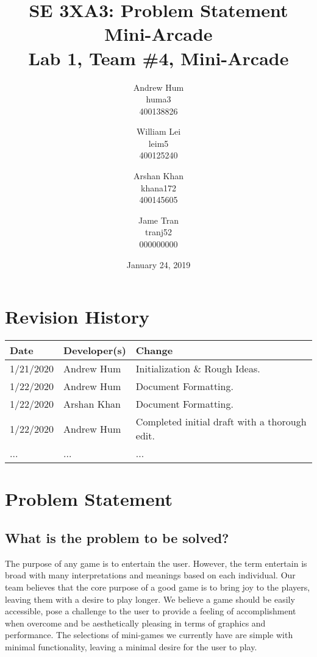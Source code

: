\documentclass{article}
\title{SE 3XA3: Problem Statement \\ Mini-Arcade \\{\large Lab 1, Team \#4, Mini-Arcade}}
\author{Andrew Hum \\ huma3 \\ 400138826 \and
		William Lei \\ leim5 \\ 400125240 \and
		Arshan Khan \\ khana172 \\ 400145605 \and
		Jame Tran \\ tranj52 \\ 000000000
}
\date{January 24, 2019}
\begin{document}
\maketitle
\newpage

\tableofcontents
\newpage



\begin{table}[hp]
\section{Revision History} \label{TblRevisionHistory}
\begin{tabularx}{\textwidth}{llX}
\hline
\textbf{Date} & \textbf{Developer(s)} & \textbf{Change}\\
\hline
1/21/2020 & Andrew Hum & Initialization \& Rough Ideas.\\
\hline
1/22/2020 & Andrew Hum  & Document Formatting.\\
\hline
1/22/2020 & Arshan Khan & Document Formatting.\\
\hline
1/22/2020 & Andrew Hum & Completed initial draft with a thorough edit. \\
\hline
... & ... & ...\\
\hline
\end{tabularx}
\end{table}

\newpage

\section{Problem Statement}
\subsection{What is the problem to be solved?}
The purpose of any game is to entertain the user. However, the term entertain is broad with many interpretations and meanings based on each individual. Our team believes that the core purpose of a good game is to bring joy to the players, leaving them with a desire to play longer. We believe a game should be easily accessible, pose a challenge to the user to provide a feeling of accomplishment when overcome and be aesthetically pleasing in terms of graphics and performance. The selections of mini-games we currently have are simple with minimal functionality, leaving a minimal desire for the user to play.
\end{document}
